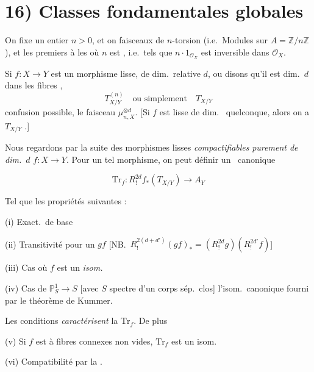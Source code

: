 \documentclass[11pt,a4paper]{article}
\begin{document}
\section{16) Classes fondamentales globales}

On fixe un entier $n > 0$, et on \ill{}
  \ill{} faisceaux de $n$-torsion
(i.e.\ Modules sur $A = \mathbb{Z}/n\mathbb{Z}$), et les \ill{} premiers à \ill{} \ill{} les  où $n$ est
, i.e.\ tels que $n \cdot 1_{\mathcal{O}_X}$ est inversible dans $\mathcal{O}_X$.

Si $f : X \to Y$ est un morphisme lisse, de dim.\ relative $d$, ou disons qu'il est   dim.\ $d$
 dans les fibres \ill{} \ill{} \ill{},
\[
  T^{(n)}_{X/Y} \quad\text{ou simplement}\quad T_{X/Y}
\]
\ill{} confusion possible, le faisceau $\mu_{n,X}^{\otimes d}$. [Si $f$ est lisse de dim.\  \ill{}
quelconque, alors on a \ill{} \ill{} \ill{} \ill{} \ill{} $T_{X/Y}$ \ill{} \ill{} \ill{} \ill{} \ill{} \ill{}.]

Nous regardons par la suite des morphismes lisses \emph{compactifiables} \emph{purement de dim.\ $d$}
$f : X \to Y$. Pour un tel morphisme, on peut définir un \struck{\ill{}} \ canonique

\[
  \mathrm{Tr}_f : R^{2d}_{!} f_{*}(T_{X/Y}) \longrightarrow A_Y
\]

Tel que les propriétés suivantes :

(i) Exact.\ de base \ill{}

(ii) Transitivité pour un \struck{\ill{}}  $gf$
[NB.\ $R^{2(d+d')}_{!}(gf)_{*} = (R^{2d}_{!} g)(R^{2d'}_{!} f)$]

(iii) Cas où $f$ est un \emph{isom.}

(iv) \struck{\ill{}} Cas de $\mathbb{P}^1_S \to S$
[avec $S$ spectre d'un corps \ill{} \ill{} sép.\ clos]
 l'isom.\ canonique fourni par le théorème de Kummer.

Les conditions \emph{caractérisent} la  $\mathrm{Tr}_f$. De plus

(v) Si $f$ est à fibres connexes non vides, $\mathrm{Tr}_f$ est un isom.

(vi) Compatibilité par la .

\struck{\ill{}}
\end{document}
